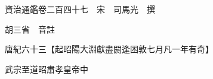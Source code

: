 










 


 
 


 

  
  
  
  
  





  
  
  
  
  
 
  

  

  
  
  



  

 
 

  
   




  

  
  


  　　資治通鑑卷二百四十七　宋　司馬光　撰

　　胡三省　音註

　　唐紀六十三【起昭陽大淵獻盡閼逢困敦七月凡一年有奇】

　　武宗至道昭肅孝皇帝中

